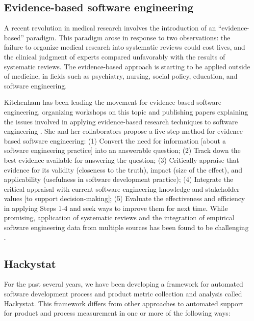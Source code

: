 \subsection{Evidence-based software engineering}

A recent revolution in medical research involves the introduction of an
``evidence-based'' paradigm.  This paradigm arose in response to two
observations: the failure to organize medical research into systematic
reviews could cost lives, and the clinical judgment of experts compared
unfavorably with the results of systematic reviews.   The evidence-based 
approach is starting to be applied outside of medicine, in fields such as
psychiatry, nursing, social policy, education, and software engineering. 

Kitchenham has been leading the movement for evidence-based software
engineering, organizing workshops on this topic and publishing papers
explaining the issues involved in applying evidence-based research
techniques to software engineering \cite{Kitchenham04,Kitchenham04a}.  She
and her collaborators propose a five step method for evidence-based
software engineering: (1) Convert the need for information [about a
software engineering practice] into an answerable question; (2) Track down
the best evidence available for answering the question; (3) Critically
appraise that evidence for its validity (closeness to the truth), impact
(size of the effect), and applicability (usefulness in software development
practice); (4) Integrate the critical appraisal with current software
engineering knowledge and stakeholder values [to support decision-making];
(5) Evaluate the effectiveness and efficiency in applying Steps 1-4 and
seek ways to improve them for next time.  While promising, application of 
systematic reviews and the integration of empirical software engineering data
from multiple sources has been found to be challenging \cite{Jedlitschka04}.



\subsection{Hackystat}

For the past several years, we have been developing a framework for
automated software development process and product metric collection
and analysis called Hackystat.  This framework differs from other
approaches to automated support for product and process measurement in
one or more of the following ways:

